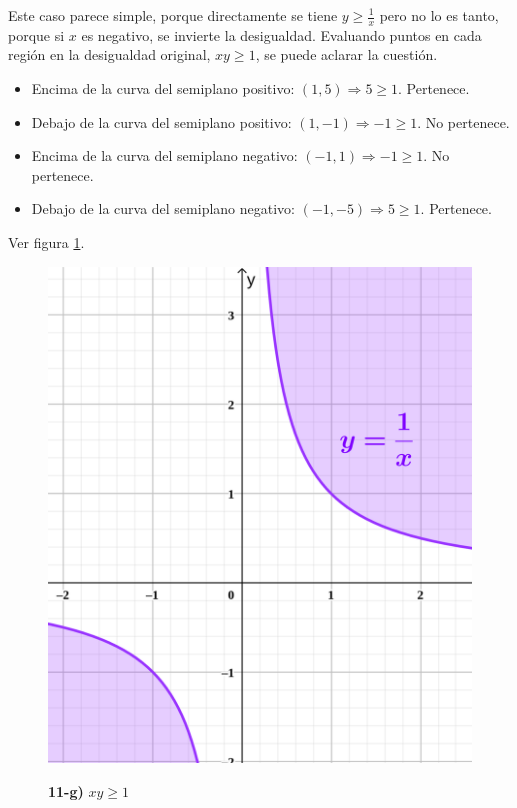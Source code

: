 \documentclass{article}
\begin{document}
Este caso parece simple, porque directamente se tiene $y \geq \frac{1}{x}$ pero no lo es tanto, porque si $x$ es negativo, se invierte la desigualdad. Evaluando puntos en cada región en la desigualdad original, $x y \geq 1$, se puede aclarar la cuestión.

\begin{itemize}
\item Encima de la curva del semiplano positivo: $(1, 5) \Rightarrow 5 \geq 1$. Pertenece.
\item Debajo de la curva del semiplano positivo: $(1, -1) \Rightarrow -1 \geq 1$. No pertenece.
\item Encima de la curva del semiplano negativo: $(-1, 1) \Rightarrow -1 \geq 1$. No pertenece.
\item Debajo de la curva del semiplano negativo: $(-1, -5) \Rightarrow 5 \geq 1$. Pertenece.
\end{itemize}

Ver figura \ref{fig:1-11-g}.

\begin{figure}[ht]
\caption{\textbf{11-g)} $x y \geq 1$}
\includegraphics[scale=0.75]{../img/exercises/guide_01/11_g.png} 
\centering
\label{fig:1-11-g}
\end{figure}
\end{document}

